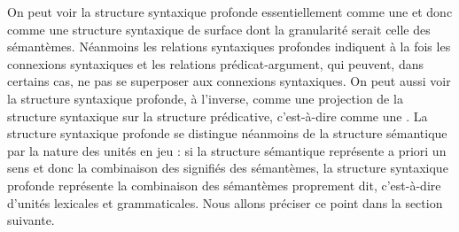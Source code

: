 On peut voir la structure syntaxique profonde essentiellement comme une  et donc comme une structure syntaxique de surface dont la granularité serait celle des sémantèmes. Néanmoins les relations syntaxiques profondes indiquent à la fois les connexions syntaxiques et les relations prédicat-argument, qui peuvent, dans certains cas, ne pas se superposer aux connexions syntaxiques.
On peut aussi voir la structure syntaxique profonde, à l’inverse, comme une projection de la structure syntaxique sur la structure prédicative, c’est-à-dire comme une . La structure syntaxique profonde se distingue néanmoins de la structure sémantique par la nature des unités en jeu : si la structure sémantique représente a priori un sens et donc la combinaison des signifiés des sémantèmes, la structure syntaxique profonde représente la combinaison des sémantèmes proprement dit, c’est-à-dire d’unités lexicales et grammaticales. Nous allons préciser ce point dans la section suivante.

